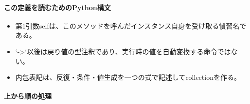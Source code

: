 \documentclass[a4paper,11pt]{article}
\begin{document}
            \paragraph{この定義を読むためのPython構文}
            \begin{itemize}[leftmargin=1.6em]
            \item 第1引数selfは、このメソッドを呼んだインスタンス自身を受け取る慣習名である。
\item `->`以後は戻り値の型注釈であり、実行時の値を自動変換する命令ではない。
\item 内包表記は、反復・条件・値生成を一つの式で記述してcollectionを作る。
            \end{itemize}
            \paragraph{上から順の処理}
\end{document}
